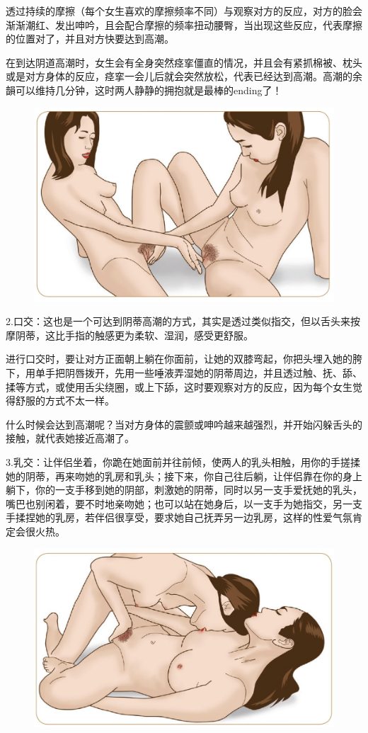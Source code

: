 \documentclass[12pt,UTF8]{ctexbook}
\begin{document}
透过持续的摩擦（每个女生喜欢的摩擦频率不同）与观察对方的反应，对方的脸会渐渐潮红、发出呻吟，且会配合摩擦的频率扭动腰臀，当出现这些反应，代表摩擦的位置对了，并且对方快要达到高潮。

在到达阴道高潮时，女生会有全身突然痉挛僵直的情况，并且会有紧抓棉被、枕头或是对方身体的反应，痉挛一会儿后就会突然放松，代表已经达到高潮。高潮的余韻可以维持几分钟，这时两人静静的拥抱就是最棒的ending了！

\begin{figure}[H]
	\centering
	\includegraphics[width=0.7\linewidth]{10}
	\caption{}
	\label{fig:1}
\end{figure}

2.口交：这也是一个可达到阴蒂高潮的方式，其实是透过类似指交，但以舌头来按摩阴蒂，这比手指的触感更为柔软、湿润，感受更舒服。

进行口交时，要让对方正面朝上躺在你面前，让她的双膝弯起，你把头埋入她的胯下，用单手把阴唇拨开，先用一些唾液弄湿她的阴蒂周边，并且透过触、抚、舔、揉等方式，或使用舌尖绕圈，或上下舔，这时要观察对方的反应，因为每个女生觉得舒服的方式不太一样。

什么时候会达到高潮呢？当对方身体的震颤或呻吟越来越强烈，并开始闪躲舌头的接触，就代表她接近高潮了。

3.乳交：让伴侣坐着，你跪在她面前并往前倾，使两人的乳头相触，用你的手搓揉她的阴蒂，再来吻她的乳房和乳头；接下来，你自己往后躺，让伴侣靠在你的身上躺下，你的一支手移到她的阴部，刺激她的阴蒂，同时以另一支手爱抚她的乳头，嘴巴也别闲着，要不时地亲吻她；也可以站在她身后，以一支手为她指交，另一支手揉捏她的乳房，若伴侣很享受，要求她自己抚弄另一边乳房，这样的性爱气氛肯定会很火热。

\begin{figure}[H]
	\centering
	\includegraphics[width=0.7\linewidth]{11}
	\caption{}
	\label{fig:1}
\end{figure}
\end{document}
